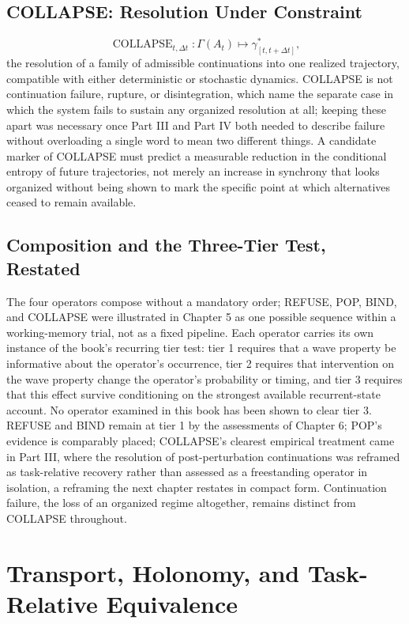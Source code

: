 \documentclass[11pt]{book}
\begin{document}
\section*{COLLAPSE: Resolution Under Constraint}

\[
\operatorname{COLLAPSE}_{t,\Delta t}:\Gamma(A_t)\longmapsto\gamma^{*}_{[t,t+\Delta t]},
\]
the resolution of a family of admissible continuations into one realized trajectory, compatible with either deterministic or stochastic dynamics. COLLAPSE is not continuation failure, rupture, or disintegration, which name the separate case in which the system fails to sustain any organized resolution at all; keeping these apart was necessary once Part III and Part IV both needed to describe failure without overloading a single word to mean two different things. A candidate marker of COLLAPSE must predict a measurable reduction in the conditional entropy of future trajectories, not merely an increase in synchrony that looks organized without being shown to mark the specific point at which alternatives ceased to remain available.

\section*{Composition and the Three-Tier Test, Restated}

The four operators compose without a mandatory order; REFUSE, POP, BIND, and COLLAPSE were illustrated in Chapter 5 as one possible sequence within a working-memory trial, not as a fixed pipeline. Each operator carries its own instance of the book's recurring tier test: tier 1 requires that a wave property be informative about the operator's occurrence, tier 2 requires that intervention on the wave property change the operator's probability or timing, and tier 3 requires that this effect survive conditioning on the strongest available recurrent-state account. No operator examined in this book has been shown to clear tier 3. REFUSE and BIND remain at tier 1 by the assessments of Chapter 6; POP's evidence is comparably placed; COLLAPSE's clearest empirical treatment came in Part III, where the resolution of post-perturbation continuations was reframed as task-relative recovery rather than assessed as a freestanding operator in isolation, a reframing the next chapter restates in compact form. Continuation failure, the loss of an organized regime altogether, remains distinct from COLLAPSE throughout.

\chapter{Transport, Holonomy, and Task-Relative Equivalence}
\end{document}
